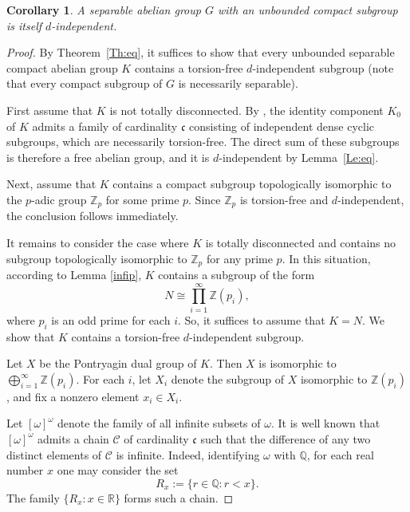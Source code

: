 \documentclass[12pt]{amsart}
\newtheorem{corollary}[theorem]{Corollary}
\theoremstyle{definition}
\theoremstyle{remark}
\begin{document}
\begin{corollary}\label{unbounded} 
A separable abelian group $G$ with an unbounded compact subgroup is itself
$d$-independent.
\end{corollary}

\begin{proof}
By Theorem~\ref{Th:eq}, it suffices to show that every unbounded separable
compact abelian group $K$ contains a torsion-free $d$-independent subgroup
(note that every compact subgroup of $G$ is necessarily separable).

First assume that $K$ is not totally disconnected.
By \cite[Lemma~2.37]{MT}, the identity component $K_0$ of $K$ admits a family
of cardinality $\mathfrak{c}$ consisting of independent dense cyclic
subgroups, which are necessarily torsion-free.
The direct sum of these subgroups is therefore a free abelian group, and it
is $d$-independent by Lemma~\ref{Le:eq}.

Next, assume that $K$ contains a compact subgroup topologically isomorphic to
the $p$-adic group $\mathbb{Z}_p$ for some prime $p$.
Since $\mathbb{Z}_p$ is torsion-free and $d$-independent, the conclusion
follows immediately.

It remains to consider the case where $K$ is totally disconnected and
contains no subgroup topologically isomorphic to $\mathbb{Z}_p$ for any
prime $p$.
In this situation, according to Lemma \ref{infip}, $K$ contains a subgroup of the form
\[
N\cong\prod_{i=1}^{\infty}\mathbb{Z}(p_i),
\]
where $p_i$ is an odd prime for each $i$.
So, it suffices to assume that $K=N$.
We show that $K$ contains a torsion-free $d$-independent subgroup.


Let $X$ be the Pontryagin dual group of $K$.
Then $X$ is isomorphic to $\bigoplus_{i=1}^{\infty}\mathbb{Z}(p_i)$.
For each $i$, let $X_i$ denote the subgroup of $X$ isomorphic to
$\mathbb{Z}(p_i)$, and fix a nonzero element $x_i\in X_i$.

Let $[\omega]^{\omega}$ denote the family of all infinite subsets of $\omega$.
It is well known that $[\omega]^{\omega}$ admits a chain $\mathcal{C}$ of cardinality
$\mathfrak{c}$ such that the difference of any two distinct elements
of $\mathcal{C}$ is infinite.
Indeed, identifying $\omega$ with $\mathbb{Q}$, for each real number $x$ one may
consider the set
\[
R_x:=\{r\in\mathbb{Q}: r<x\}.
\]
The family $\{R_x:x\in\mathbb{R}\}$ forms such a chain.


\end{proof}
\end{document}
